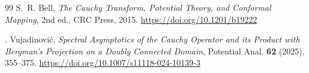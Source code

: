 \documentclass{amsart}
\theoremstyle{plain}
\theoremstyle{remark}
\begin{document}
\begin{thebibliography}{99}
S.~R. Bell,
\emph{The Cauchy Transform, Potential Theory, and Conformal Mapping},
2nd ed., CRC Press, 2015.
\url{https://doi.org/10.1201/b19222}

\DJ. Vujadinovi\'c,
\emph{Spectral Asymptotics of the Cauchy Operator and its Product with Bergman's Projection on a Doubly Connected Domain},
Potential Anal. \textbf{62} (2025), 355--375.
\url{https://doi.org/10.1007/s11118-024-10139-3}

\end{thebibliography}
\end{document}
